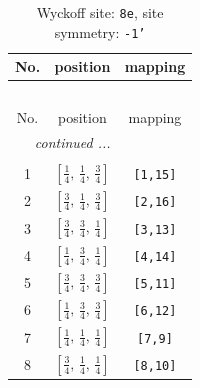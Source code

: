 \documentclass[fleqn,8pt]{jsarticle}
\begin{document}
\renewcommand{\arraystretch}{1.2}
\begin{longtable}{ccc}
\caption{Wyckoff site: {\tt 8e}, site symmetry: {\tt -1'}}
 \\
 \hline \hline
No. & position & mapping \\ \hline \endfirsthead

\multicolumn{2}{l}{\tablename\ \thetable{}} \\
 \hline \hline
No. & position & mapping \\ \hline \endhead

 \hline \hline
\multicolumn{2}{r}{\footnotesize\it continued ...} \\ \endfoot

 \hline \hline
\multicolumn{2}{r}{} \\ \endlastfoot

1 & $\left[ \frac{1}{4},\, \frac{1}{4},\, \frac{3}{4} \right]$ & {\tt [1,15]} \\ \hline
2 & $\left[ \frac{3}{4},\, \frac{1}{4},\, \frac{3}{4} \right]$ & {\tt [2,16]} \\ \hline
3 & $\left[ \frac{3}{4},\, \frac{3}{4},\, \frac{1}{4} \right]$ & {\tt [3,13]} \\ \hline
4 & $\left[ \frac{1}{4},\, \frac{3}{4},\, \frac{1}{4} \right]$ & {\tt [4,14]} \\ \hline
5 & $\left[ \frac{3}{4},\, \frac{3}{4},\, \frac{3}{4} \right]$ & {\tt [5,11]} \\ \hline
6 & $\left[ \frac{1}{4},\, \frac{3}{4},\, \frac{3}{4} \right]$ & {\tt [6,12]} \\ \hline
7 & $\left[ \frac{1}{4},\, \frac{1}{4},\, \frac{1}{4} \right]$ & {\tt [7,9]} \\ \hline
8 & $\left[ \frac{3}{4},\, \frac{1}{4},\, \frac{1}{4} \right]$ & {\tt [8,10]} \\
\end{longtable}
\renewcommand{\arraystretch}{1.2}
\end{document}
